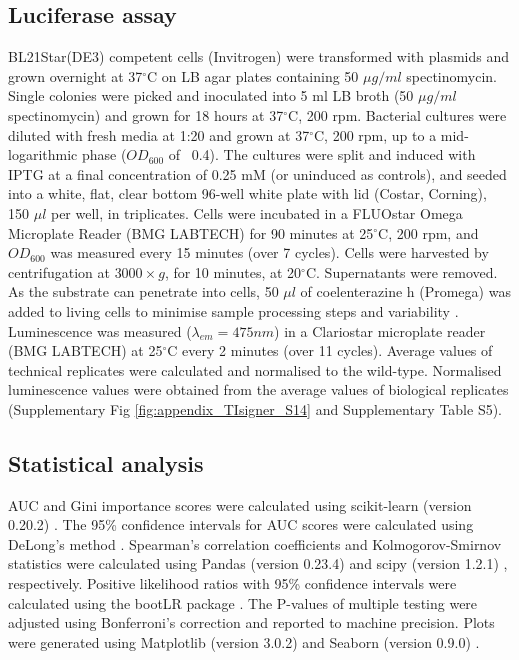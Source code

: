 \subsection{Luciferase assay}
BL21Star(DE3) competent cells (Invitrogen) were transformed with plasmids and grown overnight at 37$^{\circ}$C on LB agar plates containing 50 $\mu g/ml$ spectinomycin. Single colonies were picked and inoculated into 5 ml LB broth (50 $\mu g/ml$ spectinomycin) and grown for 18 hours at 37$^{\circ}$C, 200 rpm. Bacterial cultures were diluted with fresh media at 1:20 and grown at 37$^{\circ}$C, 200 rpm, up to a mid-logarithmic phase ($OD_{600}$ of ~0.4). The cultures were split and induced with IPTG at a final concentration of 0.25 mM (or uninduced as controls), and seeded into a white, flat, clear bottom 96-well white plate with lid (Costar, Corning), 150 $\mu l$ per well, in triplicates. Cells were incubated in a FLUOstar Omega Microplate Reader (BMG LABTECH) for 90 minutes at 25$^{\circ}$C, 200 rpm, and $OD_{600}$ was measured every 15 minutes (over 7 cycles). Cells were harvested by centrifugation at $3000 \times g$, for 10 minutes, at 20$^{\circ}$C. Supernatants were removed. As the substrate can penetrate into cells, 50 $\mu l$ of coelenterazine h (Promega) was added to living cells to minimise sample processing steps and variability \cite{Lorenz1996-kh,Fuhrmann2004-by}. Luminescence was measured ($\lambda_{em} = 475 nm$) in a Clariostar microplate reader (BMG LABTECH) at 25$^{\circ}$C every 2 minutes (over 11 cycles). Average values of technical replicates were calculated and normalised to the wild-type. Normalised luminescence values were obtained from the average values of biological replicates (Supplementary Fig \ref{fig:appendix_TIsigner_S14} and Supplementary Table S5).

\subsection{Statistical analysis}
AUC and Gini importance scores were calculated using scikit-learn (version 0.20.2) \cite{Pedregosa2011-cd}. The 95\% confidence intervals for AUC scores were calculated using DeLong’s method \cite{DeLong1988-oo}. Spearman’s correlation coefficients and Kolmogorov-Smirnov statistics were calculated using Pandas (version 0.23.4) \cite{McKinney2010-rg} and scipy (version 1.2.1) \cite{Oliphant2007-za,Millman2011-tt}, respectively. Positive likelihood ratios with 95\% confidence intervals were calculated using the bootLR package \cite{Marill2017-qb,R_Core_Team2019-kt}. The P-values of multiple testing were adjusted using Bonferroni's correction and reported to machine precision. Plots were generated using Matplotlib (version 3.0.2) \cite{noauthor_undated-nq} and Seaborn (version 0.9.0) \cite{Waskom2018-dp}. 

